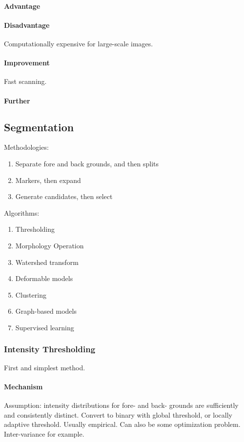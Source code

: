 \documentclass[10pt,a4paper]{article}
\begin{document}
\paragraph{Advantage}
\paragraph{Disadvantage}
Computationally expensive for large-scale images.
\paragraph{Improvement}
Fast scanning.
\paragraph{Further}

\subsection{Segmentation}
Methodologies:
\begin{enumerate}
	\item Separate fore and back grounds, and then splits
	\item Markers, then expand
	\item Generate candidates, then select
\end{enumerate}
Algorithms:
\begin{enumerate}
	\item Thresholding
	\item Morphology Operation
	\item Watershed transform
	\item Deformable models
	\item Clustering
	\item Graph-based models
	\item Supervised learning
\end{enumerate}

\subsubsection{Intensity Thresholding}
First and simplest method.
\paragraph{Mechanism}
Assumption: intensity distributions for fore- and back- grounds are sufficiently and consistently distinct. Convert to binary with global threshold, or locally adaptive threshold. Usually empirical. Can also be some optimization problem. Inter-variance for example. 
\end{document}
